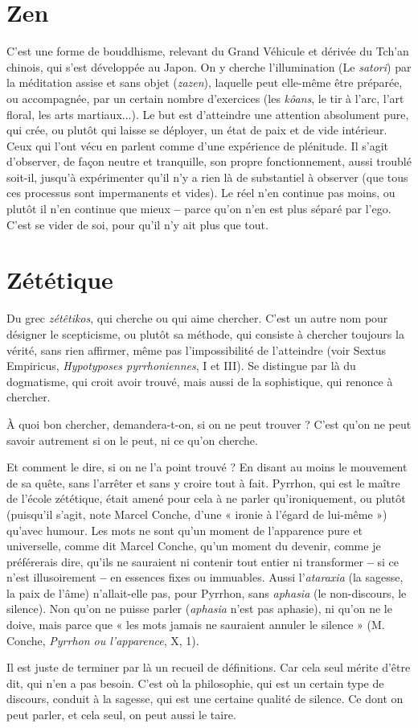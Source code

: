 \section{Zen}
C'est une forme de bouddhisme, relevant du Grand Véhicule et dérivée
du Tch’an chinois, qui s’est développée au Japon. On y cherche
l’illumination (Le {\it satori}) par la méditation assise et sans objet ({\it zazen}), laquelle
peut elle-même être préparée, ou accompagnée, par un certain nombre d’exercices
(les {\it kôans}, le tir à l'arc, l’art floral, les arts martiaux...). Le but est
d'atteindre une attention absolument pure, qui crée, ou plutôt qui laisse se
déployer, un état de paix et de vide intérieur. Ceux qui l’ont vécu en parlent
comme d’une expérience de plénitude. Il s’agit d’observer, de façon neutre et
tranquille, son propre fonctionnement, aussi troublé soit-il, jusqu’à expérimenter
qu’il n’y a rien là de substantiel à observer (que tous ces processus sont
impermanents et vides). Le réel n’en continue pas moins, ou plutôt il n’en
continue que mieux {\bf --} parce qu’on n’en est plus séparé par l’ego. C’est se vider
de soi, pour qu’il n’y ait plus que tout.

\section{Zététique}
Du grec {\it zétêtikos}, qui cherche ou qui aime chercher. C’est un
autre nom pour désigner le scepticisme, ou plutôt sa méthode,
qui consiste à chercher toujours la vérité, sans rien affirmer, même pas l’impossibilité
de l’atteindre (voir Sextus Empiricus, {\it Hypotyposes pyrrhoniennes}, I et
III). Se distingue par là du dogmatisme, qui croit avoir trouvé, mais aussi de la
sophistique, qui renonce à chercher.

À quoi bon chercher, demandera-t-on, si on ne peut trouver ? C’est qu’on
ne peut savoir autrement si on le peut, ni ce qu’on cherche.

Et comment le dire, si on ne l’a point trouvé ? En disant au moins le mouvement
de sa quête, sans l'arrêter et sans y croire tout à fait. Pyrrhon, qui est le
maître de l’école zététique, était amené pour cela à ne parler qu’ironiquement,
ou plutôt (puisqu'il s’agit, note Marcel Conche, d’une « ironie à l’égard de lui-même »)
qu'avec humour. Les mots ne sont qu’un moment de l'apparence pure
et universelle, comme dit Marcel Conche, qu’un moment du devenir, comme
je préférerais dire, qu’ils ne sauraient ni contenir tout entier ni transformer {\bf --} si
ce n’est illusoirement {\bf --} en essences fixes ou immuables. Aussi l’{\it ataraxia} (la
sagesse, la paix de l’âme) n’allait-elle pas, pour Pyrrhon, sans {\it aphasia} (le non-discours,
le silence). Non qu’on ne puisse parler ({\it aphasia} n’est pas aphasie), ni
qu’on ne le doive, mais parce que « les mots jamais ne sauraient annuler le
silence » (M. Conche, {\it Pyrrhon ou l'apparence}, X, 1).

Il est juste de terminer par là un recueil de définitions. Car cela seul mérite
d’être dit, qui n’en a pas besoin. C’est où la philosophie, qui est un certain type
de discours, conduit à la sagesse, qui est une certaine qualité de silence. Ce dont
on peut parler, et cela seul, on peut aussi le taire.

